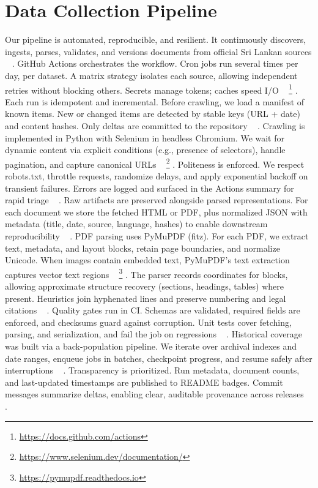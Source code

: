 \documentclass[10pt,a4paper]{article}%
\begin{document}
\section{Data Collection Pipeline}%
\label{sec:DataCollectionPipeline}%
Our pipeline is automated, reproducible, and resilient. It continuously discovers, ingests, parses, validates, and versions documents from official Sri Lankan sources%
~%
\citep{MLOpsSurvey2022}%
.%
GitHub Actions orchestrates the workflow. Cron jobs run several times per day, per dataset. A matrix strategy isolates each source, allowing independent retries without blocking others. Secrets manage tokens; caches speed I/O%
~%
\footnote{\href{https://docs.github.com/actions}{https://docs.github.com/actions}}%
.%
Each run is idempotent and incremental. Before crawling, we load a manifest of known items. New or changed items are detected by stable keys (URL + date) and content hashes. Only deltas are committed to the repository%
~%
\citep{ReproducibleResearch2017}%
.%
Crawling is implemented in Python with Selenium in headless Chromium. We wait for dynamic content via explicit conditions (e.g., presence of selectors), handle pagination, and capture canonical URLs%
~%
\footnote{\href{https://www.selenium.dev/documentation/}{https://www.selenium.dev/documentation/}}%
.%
Politeness is enforced. We respect robots.txt, throttle requests, randomize delays, and apply exponential backoff on transient failures. Errors are logged and surfaced in the Actions summary for rapid triage%
~%
\citep{WebCrawlingBestPractices2021}%
.%
Raw artifacts are preserved alongside parsed representations. For each document we store the fetched HTML or PDF, plus normalized JSON with metadata (title, date, source, language, hashes) to enable downstream reproducibility%
~%
\citep{DataVersioning2020}%
.%
PDF parsing uses PyMuPDF (fitz). For each PDF, we extract text, metadata, and layout blocks, retain page boundaries, and normalize Unicode. When images contain embedded text, PyMuPDF’s text extraction captures vector text regions%
~%
\footnote{\href{https://pymupdf.readthedocs.io}{https://pymupdf.readthedocs.io}}%
.%
The parser records coordinates for blocks, allowing approximate structure recovery (sections, headings, tables) where present. Heuristics join hyphenated lines and preserve numbering and legal citations%
~%
\citep{DocumentLayoutAnalysis2021}%
.%
Quality gates run in CI. Schemas are validated, required fields are enforced, and checksums guard against corruption. Unit tests cover fetching, parsing, and serialization, and fail the job on regressions%
~%
\citep{DataQuality2022}%
.%
Historical coverage was built via a back-population pipeline. We iterate over archival indexes and date ranges, enqueue jobs in batches, checkpoint progress, and resume safely after interruptions%
~%
\citep{HistoricalWebData2019}%
.%
Transparency is prioritized. Run metadata, document counts, and last-updated timestamps are published to README badges. Commit messages summarize deltas, enabling clear, auditable provenance across releases%
~%
\citep{OpenDataPractices2020}%
.
\end{document}
